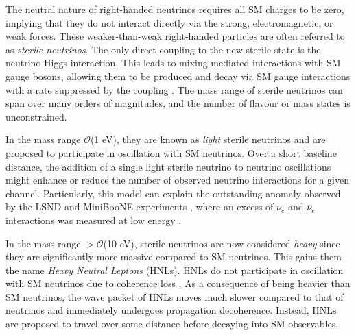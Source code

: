 The neutral nature of right-handed neutrinos requires all SM charges to be zero, implying that they do not interact directly via the strong, electromagnetic, or weak forces.
These weaker-than-weak right-handed particles are often referred to as \textit{sterile neutrinos}.
The only direct coupling to the new sterile state is the neutrino-Higgs interaction.
This leads to mixing-mediated interactions with SM gauge bosons, allowing them to be produced and decay via SM gauge interactions with a rate suppressed by the coupling \cite{SBNHNL}.
The mass range of sterile neutrinos can span over many orders of magnitudes, and the number of flavour or mass states is unconstrained.

In the mass range $\mathcal{O}$(1 eV), they are known as \textit{light} sterile neutrinos and are proposed to participate in oscillation with SM neutrinos.
Over a short baseline distance, the addition of a single light sterile neutrino to neutrino oscillations might enhance or reduce the number of observed neutrino interactions for a given channel. 
Particularly, this model can explain the outstanding anomaly observed by the LSND \cite{LSND_anomaly} and MiniBooNE experiments \cite{Miniboone_anomaly}, where an excess of $\nu_e$ and $\overline{\nu}_e$ interactions was measured at low energy \cite{HNLWhitePaper}. 

In the mass range $> \mathcal{O}$(10 eV), sterile neutrinos are now considered \textit{heavy} since they are significantly more massive compared to SM neutrinos.
This gains them the name \textit{Heavy Neutral Leptons} (HNLs).
HNLs do not participate in oscillation with SM neutrinos due to coherence loss \cite{SBNHNL}.
As a consequence of being heavier than SM neutrinos, the wave packet of HNLs moves much slower compared to that of neutrinos and immediately undergoes propagation decoherence.
Instead, HNLs are proposed to travel over some distance before decaying into SM observables.

